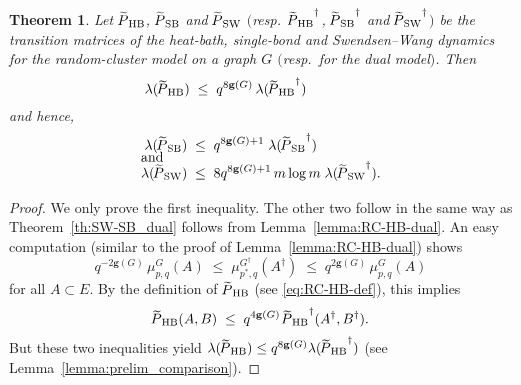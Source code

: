 \documentclass{dis}
\newtheorem{theorem}{Theorem}[chapter]
\theoremstyle{citing}
\begin{document}
\begin{theorem} \label{th:SW-SB_dual2}
Let ${{\raisebox{2pt}{ ${\widetilde{{}}}$ }\mkern-14mu P}_{\rm HB}}$, ${{\raisebox{2pt}{ ${\widetilde{{}}}$ }\mkern-14mu P}_{\rm SB}}$ and ${{\raisebox{2pt}{ ${\widetilde{{}}}$ }\mkern-14mu P}_{\rm SW}}$ 
$($resp.~${{\raisebox{2pt}{ ${\widetilde{{}}}$ }\mkern-14mu P}_{\rm HB}}^\dag$, ${{\raisebox{2pt}{ ${\widetilde{{}}}$ }\mkern-14mu P}_{\rm SB}}^\dag$ and ${{\raisebox{2pt}{ ${\widetilde{{}}}$ }\mkern-14mu P}_{\rm SW}}^\dag$$)$ be the 
transition matrices of the 
heat-bath, single-bond and Swendsen--Wang dynamics for the 
random-cluster model on a graph $G$ $($resp.~for the dual model\/$)$.
Then
\[
\lambda({{\raisebox{2pt}{ ${\widetilde{{}}}$ }\mkern-14mu P}_{\rm HB}}) \;\le\; q^{8{\ensuremath{\mathbf{g}}}(G)}\,\lambda({{\raisebox{2pt}{ ${\widetilde{{}}}$ }\mkern-14mu P}_{\rm HB}}^\dag) \qquad\qquad\quad
\]
and hence,
\begin{align*}
\lambda({{\raisebox{2pt}{ ${\widetilde{{}}}$ }\mkern-14mu P}_{\rm SB}}) \;&\le\; q^{8{\ensuremath{\mathbf{g}}}(G)+1} \; \lambda({{\raisebox{2pt}{ ${\widetilde{{}}}$ }\mkern-14mu P}_{\rm SB}}^\dag) \\[-3mm]
\intertext{\vspace*{-2mm}and}
\lambda({{\raisebox{2pt}{ ${\widetilde{{}}}$ }\mkern-14mu P}_{\rm SW}}) \;&\le\; 8q^{8{\ensuremath{\mathbf{g}}}(G)+1}\, m \log m\; \lambda({{\raisebox{2pt}{ ${\widetilde{{}}}$ }\mkern-14mu P}_{\rm SW}}^\dag).
\end{align*}
\end{theorem}
\vspace{3mm}

\begin{proof}
We only prove the first inequality. 
The other two follow in the same way as Theorem~\ref{th:SW-SB_dual} 
follows from Lemma~\ref{lemma:RC-HB-dual}. 
An easy computation (similar to the proof of 
Lemma~\ref{lemma:RC-HB-dual}) shows
\[
q^{-2{\ensuremath{\mathbf{g}}}(G)}\,\mu_{p,q}^G(A) \;\le\; 
\mu_{p^*,q}^{G^\dag}(A^\dag) 
\;\le\; q^{2{\ensuremath{\mathbf{g}}}(G)}\,\mu_{p,q}^G(A)
\]
for all $A\subset E$. 
By the definition of ${{\raisebox{2pt}{ ${\widetilde{{}}}$ }\mkern-14mu P}_{\rm HB}}$ (see \eqref{eq:RC-HB-def}), this implies 
\vspace{1mm}
\[
{{\raisebox{2pt}{ ${\widetilde{{}}}$ }\mkern-14mu P}_{\rm HB}}(A,B) \;\le\; q^{4{\ensuremath{\mathbf{g}}}(G)}\,{{\raisebox{2pt}{ ${\widetilde{{}}}$ }\mkern-14mu P}_{\rm HB}}^\dag(A^\dag,B^\dag).
\vspace{1mm}
\]
But these two inequalities yield 
$\lambda({{\raisebox{2pt}{ ${\widetilde{{}}}$ }\mkern-14mu P}_{\rm HB}}) \le q^{8{\ensuremath{\mathbf{g}}}(G)}\lambda({{\raisebox{2pt}{ ${\widetilde{{}}}$ }\mkern-14mu P}_{\rm HB}}^\dag)$ (see 
Lemma~\ref{lemma:prelim_comparison}).
\end{proof}
\vspace{3mm}
\end{document}
